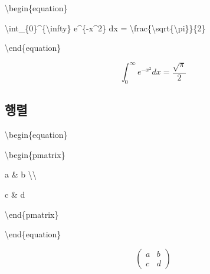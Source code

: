 \documentclass[
  letterpaper,
]{book}
\newenvironment{Shaded}{\begin{snugshade}}{\end{snugshade}}
\newcommand{\ExtensionTok}[1]{\textcolor[rgb]{0.00,0.23,0.31}{#1}}
\newcommand{\KeywordTok}[1]{\textcolor[rgb]{0.00,0.23,0.31}{#1}}
\newcommand{\NormalTok}[1]{\textcolor[rgb]{0.00,0.23,0.31}{#1}}
\newcommand{\SpecialCharTok}[1]{\textcolor[rgb]{0.37,0.37,0.37}{#1}}
\newcommand{\SpecialStringTok}[1]{\textcolor[rgb]{0.13,0.47,0.30}{#1}}
\begin{document}
\begin{Shaded}
\begin{Highlighting}[]
\KeywordTok{\textbackslash{}begin}\NormalTok{\{}\ExtensionTok{equation}\NormalTok{\}}

\SpecialCharTok{\textbackslash{}int}\SpecialStringTok{\_\{0\}\^{}\{}\SpecialCharTok{\textbackslash{}infty}\SpecialStringTok{\} e\^{}\{{-}x\^{}2\} dx = }\SpecialCharTok{\textbackslash{}frac}\SpecialStringTok{\{}\SpecialCharTok{\textbackslash{}sqrt}\SpecialStringTok{\{}\SpecialCharTok{\textbackslash{}pi}\SpecialStringTok{\}\}\{2\}}

\KeywordTok{\textbackslash{}end}\NormalTok{\{}\ExtensionTok{equation}\NormalTok{\}}
\end{Highlighting}
\end{Shaded}

\begin{equation}

\int_{0}^{\infty} e^{-x^2} dx = \frac{\sqrt{\pi}}{2}

\end{equation}

\hypertarget{uxd589uxb82c}{%
\subsection{행렬}\label{uxd589uxb82c}}

\begin{Shaded}
\begin{Highlighting}[]
\KeywordTok{\textbackslash{}begin}\NormalTok{\{}\ExtensionTok{equation}\NormalTok{\}}

\KeywordTok{\textbackslash{}begin}\NormalTok{\{}\ExtensionTok{pmatrix}\NormalTok{\}}

\SpecialStringTok{a \& b }\SpecialCharTok{\textbackslash{}\textbackslash{}}

\SpecialStringTok{c \& d}

\KeywordTok{\textbackslash{}end}\NormalTok{\{}\ExtensionTok{pmatrix}\NormalTok{\}}

\KeywordTok{\textbackslash{}end}\NormalTok{\{}\ExtensionTok{equation}\NormalTok{\}}
\end{Highlighting}
\end{Shaded}

\begin{equation}

\begin{pmatrix}

a & b \\

c & d

\end{pmatrix}

\end{equation}
\end{document}
